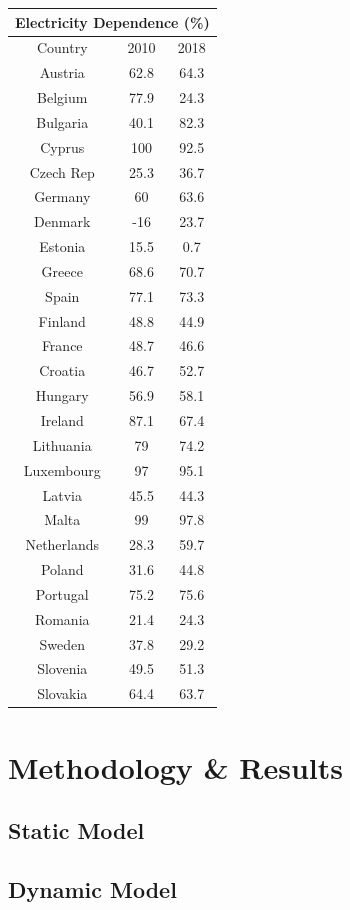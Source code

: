 \documentclass{book}
\begin{document}
\bigskip
\begin{table}[H]
\begin{center}
\begin{tabular}{|c|c|c|}
\hline
\multicolumn{3}{|c|}{Electricity Dependence (\%) }\\
\hline
Country & 2010 & 2018 \\
\hline
Austria & 62.8 & 64.3 \\
Belgium & 77.9 & 24.3 \\
Bulgaria & 40.1 & 82.3 \\
Cyprus & 100 & 92.5 \\
Czech Rep & 25.3 & 36.7\\
Germany & 60 & 63.6 \\
Denmark & -16 & 23.7 \\
Estonia & 15.5 & 0.7 \\
Greece & 68.6 & 70.7 \\
Spain & 77.1 &  73.3 \\
Finland & 48.8 & 44.9 \\
France & 48.7 & 46.6 \\
Croatia & 46.7 & 52.7 \\
Hungary &  56.9 & 58.1 \\
Ireland & 87.1 & 67.4 \\
Lithuania & 79 & 74.2 \\
Luxembourg & 97 & 95.1 \\
Latvia & 45.5 & 44.3 \\
Malta & 99 & 97.8 \\
Netherlands & 28.3 & 59.7 \\
Poland & 31.6 & 44.8 \\
Portugal & 75.2 & 75.6 \\
Romania & 21.4 & 24.3 \\
Sweden & 37.8 & 29.2 \\
Slovenia & 49.5 & 51.3 \\
Slovakia & 64.4 & 63.7 \\
\hline
\end{tabular}
\end{center}
\end{table}

\chapter*{Methodology \& Results}
\section*{Static Model}
\section*{Dynamic Model}

{}

\end{document}
